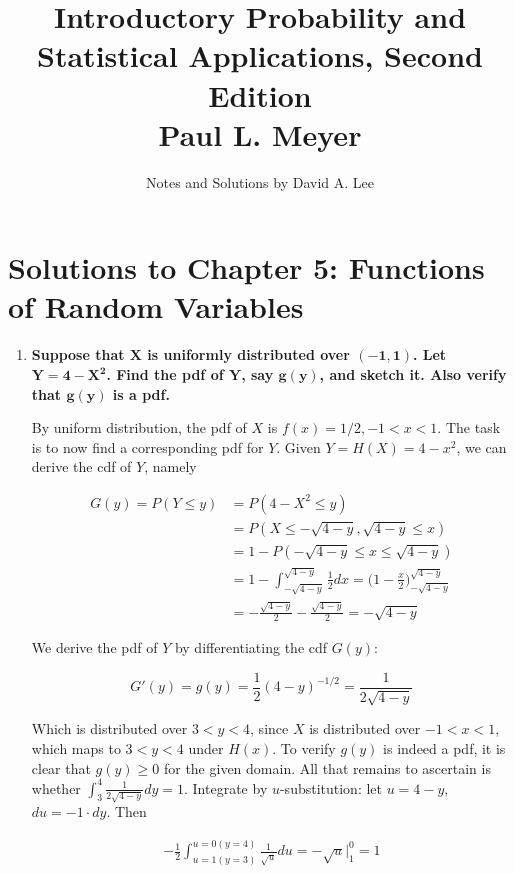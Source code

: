 \documentclass[10pt, oneside]{article}   	%
\title{Introductory Probability and Statistical Applications, Second Edition \\
\large{Paul L. Meyer}}
\author{Notes and Solutions by David A. Lee \\ }
\date{}							%
\theoremstyle{definition}
\begin{document}
\maketitle
\section*{Solutions to Chapter 5: Functions of Random Variables}

\begin{enumerate}[label=5.\arabic*]
\itemsep0em 
\item  \begin{tcolorbox}[
  colback=Cerulean!5!white,
  colframe=Cerulean!75!black]
\textbf{Suppose that $\bm{X}$ is uniformly distributed over $\bm{(-1,1)}$. Let $\bm{Y = 4 - X^2}$. Find the pdf of $\bm{Y}$, say $\bm{g(y)}$, and sketch it. Also verify that $\bm{g(y)}$ is a pdf.}
\end{tcolorbox}

By uniform distribution, the pdf of $X$ is $f(x) = 1/2, -1 < x < 1$. The task is to now find a corresponding pdf for $Y$. Given $Y = H(X) = 4 - x^2$, we can derive the cdf of $Y$, namely

\begin{align*}
G(y) = P(Y \leq y) &= P(4 - X^2 \leq y) \\
&= P(X \leq -\sqrt{4-y}, \sqrt{4-y} \leq x) \\
&= 1 - P(-\sqrt{4-y} \leq x \leq \sqrt{4-y}) \\
&= 1 - \int^{\sqrt{4-y}}_{-\sqrt{4-y}} \frac{1}{2} dx = \Big( 1 - \frac{x}{2} \Big)^{\sqrt{4-y}}_{-\sqrt{4-y}} \\
&= -\frac{\sqrt{4-y}}{2} - \frac{\sqrt{4-y}}{2} = -\sqrt{4-y}
\end{align*}

We derive the pdf of $Y$ by differentiating the cdf $G(y)$:

\[ G'(y) = g(y) = \frac{1}{2} (4-y)^{-1/2} = \boxed{ \frac{1}{2 \sqrt{4-y}} } \]

Which is distributed over $3 < y < 4$, since $X$ is distributed over $-1 < x < 1$, which maps to $3 < y < 4$ under $H(x)$. To verify $g(y)$ is indeed a pdf, it is clear that $g(y) \geq 0$ for the given domain. All that remains to ascertain is whether $\int^4_3 \frac{1}{2 \sqrt{4-y}} dy = 1$. Integrate by $u$-substitution: let $u = 4 - y$, $du = -1 \cdot dy$. Then

\begin{align*}
-\frac{1}{2} \int^{u = 0 (y = 4)}_{u = 1 (y = 3)} \frac{1}{\sqrt{u}} du = -\sqrt{u} \Big|^0_1 = \boxed{1}
\end{align*}


\end{enumerate}
\end{document}
